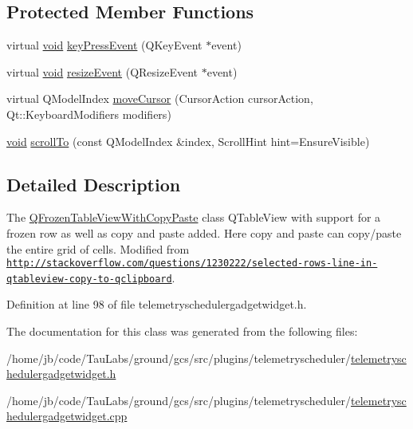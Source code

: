 \subsection*{\-Protected \-Member \-Functions}
\begin{DoxyCompactItemize}
\item 
virtual \hyperlink{group___u_a_v_objects_plugin_ga444cf2ff3f0ecbe028adce838d373f5c}{void} \hyperlink{group___telemetry_scheduler_gadget_plugin_ga9cb95e3479a049f0a4c84c58b19e7adb}{key\-Press\-Event} (\-Q\-Key\-Event $\ast$event)
\item 
virtual \hyperlink{group___u_a_v_objects_plugin_ga444cf2ff3f0ecbe028adce838d373f5c}{void} \hyperlink{group___telemetry_scheduler_gadget_plugin_ga4291c6c862d2bf7c4966e2c469891dee}{resize\-Event} (\-Q\-Resize\-Event $\ast$event)
\item 
virtual \-Q\-Model\-Index \hyperlink{group___telemetry_scheduler_gadget_plugin_gab207ef3c7d98ea292234b5d3dd605369}{move\-Cursor} (\-Cursor\-Action cursor\-Action, \-Qt\-::\-Keyboard\-Modifiers modifiers)
\item 
\hyperlink{group___u_a_v_objects_plugin_ga444cf2ff3f0ecbe028adce838d373f5c}{void} \hyperlink{group___telemetry_scheduler_gadget_plugin_ga5382af895e6230f2a8179afc8f3febd0}{scroll\-To} (const \-Q\-Model\-Index \&index, \-Scroll\-Hint hint=\-Ensure\-Visible)
\end{DoxyCompactItemize}


\subsection{\-Detailed \-Description}
\-The \hyperlink{class_q_frozen_table_view_with_copy_paste}{\-Q\-Frozen\-Table\-View\-With\-Copy\-Paste} class \-Q\-Table\-View with support for a frozen row as well as copy and paste added. \-Here copy and paste can copy/paste the entire grid of cells. \-Modified from \href{http://stackoverflow.com/questions/1230222/selected-rows-line-in-qtableview-copy-to-qclipboard}{\tt http\-://stackoverflow.\-com/questions/1230222/selected-\/rows-\/line-\/in-\/qtableview-\/copy-\/to-\/qclipboard}. 

\-Definition at line 98 of file telemetryschedulergadgetwidget.\-h.



\-The documentation for this class was generated from the following files\-:\begin{DoxyCompactItemize}
\item 
/home/jb/code/\-Tau\-Labs/ground/gcs/src/plugins/telemetryscheduler/\hyperlink{telemetryschedulergadgetwidget_8h}{telemetryschedulergadgetwidget.\-h}\item 
/home/jb/code/\-Tau\-Labs/ground/gcs/src/plugins/telemetryscheduler/\hyperlink{telemetryschedulergadgetwidget_8cpp}{telemetryschedulergadgetwidget.\-cpp}\end{DoxyCompactItemize}
